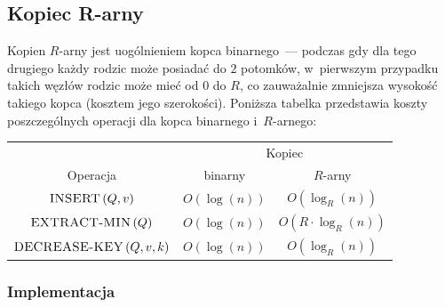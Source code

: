 \subsection{Kopiec R-arny}

Kopien $R$-arny jest uogólnieniem kopca binarnego~--- podczas gdy dla tego drugiego każdy rodzic może posiadać do $2$ potomków, w~pierwszym przypadku takich węzłów rodzic może mieć od $0$ do $R$, co zauważalnie zmniejsza wysokość takiego kopca (kosztem jego szerokości). Poniższa tabelka przedstawia koszty poszczególnych operacji dla kopca binarnego i~$R$-arnego:

\begin{center}
	\begin{tabular}{ccc}
		& \multicolumn{2}{c}{Kopiec} \\
		\cline{2-3}
		Operacja & binarny & $R$-arny \\
		\hline
		$\textrm{\textsc{INSERT}} \left( Q, v \right)$ & $O \left( \log \left( n \right) \right)$ & $O \left( \log_{R} \left( n \right) \right)$ \\
		$\textrm{\textsc{EXTRACT-MIN}} \left( Q \right)$ & $O \left( \log \left( n \right) \right)$ & $O \left( R \cdot \log_{R} \left( n \right) \right)$ \\
		$\textrm{\textsc{DECREASE-KEY}} \left( Q, v, k \right)$ & $O \left( \log \left( n \right) \right)$ & $O \left( \log_{R} \left( n \right) \right)$  \\
		\hline
	\end{tabular}
\end{center}

\subsubsection{Implementacja}

